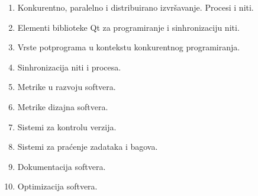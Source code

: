 \documentclass[a4paper]{article}
\begin{document}
\begin{enumerate}
	\item Konkurentno, paralelno i distribuirano izvršavanje. Procesi i niti.
	\item Elementi biblioteke Qt za programiranje i sinhronizaciju niti.
	\item Vrste potprograma u kontekstu konkurentnog programiranja.
	\item Sinhronizacija niti i procesa.
	\item Metrike u razvoju softvera.
	\item Metrike dizajna softvera.
	\item Sistemi za kontrolu verzija.
	\item Sistemi za praćenje zadataka i bagova.
	\item Dokumentacija softvera.
	\item Optimizacija softvera.
\end{enumerate}
		

\newpage

\appendix
 

\end{document}
